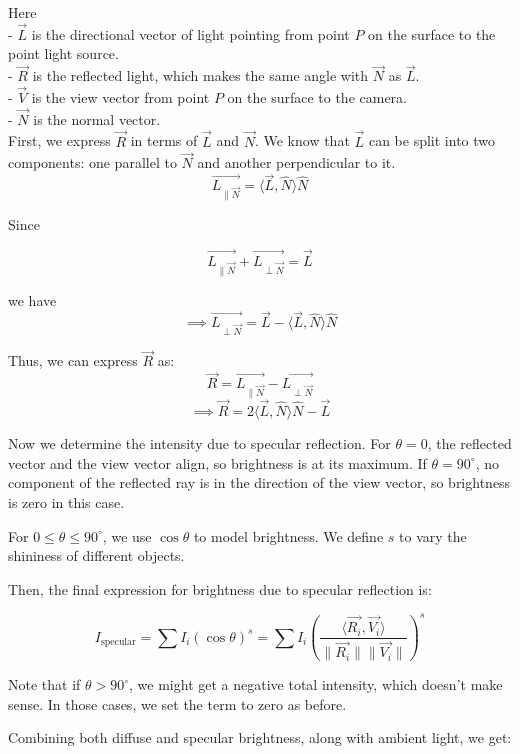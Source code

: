 \documentclass[conference]{IEEEtran}
\begin{document}
Here\\
- $\vec{L}$ is the directional vector of light pointing from point $P$ on the surface to the point light source.\\
- $\vec{R}$ is the reflected light, which makes the same angle with $\vec{N}$ as $\vec{L}$.\\
- $\vec{V}$ is the view vector from point $P$ on the surface to the camera.\\
- $\vec{N}$ is the normal vector.\\

First, we express $\vec{R}$ in terms of $\vec{L}$ and $\vec{N}$.
We know that $\vec{L}$ can be split into two components: one parallel to $\vec{N}$ and another perpendicular to it.
$$\vec{L_{\| \vec{N}}} = \langle \vec{L}, \hat{N} \rangle \hat{N}$$

Since 

$$\vec{L_{\| \vec{N}}} + \vec{L_{\perp \vec{N}}} = \vec{L}$$

we have
$$\implies \vec{L_{\perp \vec{N}}} = \vec{L} - \langle \vec{L}, \hat{N} \rangle \hat{N}$$

Thus, we can express $\vec{R}$ as:
$$\vec{R} = \vec{L_{\| \vec{N}}} - \vec{L_{\perp \vec{N}}}$$
$$\implies \vec{R} = 2 \langle \vec{L}, \hat{N} \rangle \hat{N} - \vec{L}$$

Now we determine the intensity due to specular reflection. For $\theta = 0$, the reflected vector and the view vector align, so brightness is at its maximum. If $\theta = 90^\circ$, no component of the reflected ray is in the direction of the view vector, so brightness is zero in this case.

For $0 \leq \theta \leq 90^\circ$, we use $\cos \theta$ to model brightness. We define $s$ to vary the shininess of different objects.

Then, the final expression for brightness due to specular reflection is:

\begin{equation}
    I_{\text{specular}} = \sum I_i (\cos \theta)^s = \sum I_i \left( \frac{\langle \vec{R_i}, \vec{V_i} \rangle}{\|\vec{R_i}\| \|\vec{V_i}\|} \right)^s
    \label{specular}
\end{equation}

Note that if $\theta > 90^\circ$, we might get a negative total intensity, which doesn't make sense. In those cases, we set the term to zero as before.

Combining both diffuse and specular brightness, along with ambient light, we get:
\end{document}
